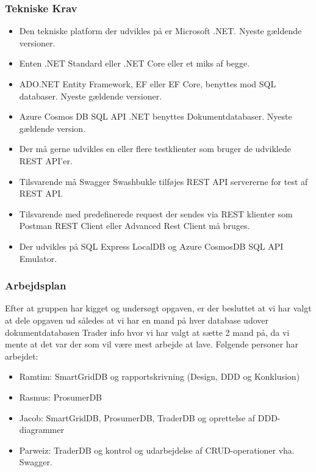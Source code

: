 \subsubsection{Tekniske Krav}

\begin{itemize}
    \item Den tekniske  platform der udvikles på er Microsoft .NET. Nyeste gældende versioner.
    \item Enten .NET Standard eller .NET Core eller et miks af begge. 
    \item ADO.NET Entity Framework, EF eller EF Core, benyttes mod SQL databaser. Nyeste gældende versioner.
    \item Azure Cosmos DB SQL API .NET benyttes Dokumentdatabaser. Nyeste gældende version.
    \item Der må gerne udvikles en eller flere testklienter som bruger de udviklede REST API'er.
    \item Tilsvarende må Swagger Swashbukle tilføjes REST API servererne for test af REST API.
    \item Tilsvarende med predefinerede request der sendes via REST klienter som Postman REST Client eller Advanced Rest Client må bruges.
    \item Der udvikles på SQL Express LocalDB og Azure CosmosDB SQL API Emulator.
\end{itemize}

\subsubsection{Arbejdsplan}

Efter at gruppen har kigget og undersøgt opgaven, er der besluttet at vi har valgt at dele opgaven ud således at vi har en mand på hver database udover dokumentdatabasen Trader info hvor vi har valgt at sætte 2 mand på, da vi mente at det var der som vil være mest arbejde at lave. Følgende personer har arbejdet:
\begin{itemize}
    \item Ramtim: SmartGridDB og rapportskrivning (Design, DDD og Konklusion)
    \item Rasmus: ProsumerDB 
    \item Jacob: SmartGridDB, ProsumerDB, TraderDB og oprettelse af DDD-diagrammer
    \item Parweiz: TraderDB og kontrol og udarbejdelse af CRUD-operationer vha. Swagger.
\end{itemize}

